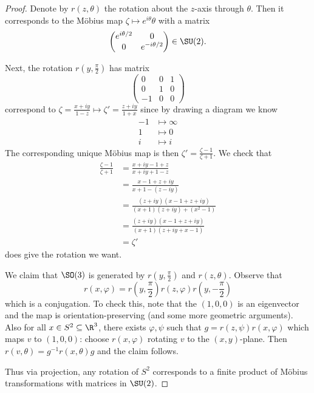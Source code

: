 \documentclass[a4paper]{article}
\theoremstyle{definition}
\begin{document}
\begin{proof}
  Denote by \(r(z, \theta)\) the rotation about the \(z\)-axis through \(\theta\). Then it corresponds to the Möbius map \(\zeta \mapsto e^{i\theta} \theta\) with a matrix
  \[
    \begin{pmatrix}
      e^{i\theta/2} & 0 \\
      0 & e^{-i\theta/2}
    \end{pmatrix}
    \in \SU(2).
  \]

  Next, the rotation \(r(y, \frac{\pi}{2})\) has matrix
  \[
    \begin{pmatrix}
      0 & 0 & 1 \\
      0 & 1 & 0 \\
      -1 & 0 & 0
    \end{pmatrix}
  \]
  correspond to \(\zeta = \frac{x + iy}{1 - z} \mapsto \zeta' = \frac{z + iy}{1 + x}\) since by drawing a diagram we know
  \begin{align*}
    -1 &\mapsto \infty \\
    1 &\mapsto 0 \\
    i &\mapsto i
  \end{align*}
  The corresponding unique Möbius map is then \(\zeta' = \frac{\zeta - 1}{\zeta + 1}\). We check that
  \begin{align*}
    \frac{\zeta - 1}{\zeta + 1}
    &= \frac{x + iy - 1 + z}{x + iy +1 - z} \\
    &= \frac{x - 1 + z + iy}{x + 1 - (z - iy)} \\
    &= \frac{(z + iy)(x - 1 + z + iy)}{(x + 1)(z + iy) + (x^2 - 1)} \\
    &= \frac{(z + iy)(x - 1 + z + iy)}{(x + 1)(z + iy + x -1)} \\
    &= \zeta'
  \end{align*}
  does give the rotation we want.

  We claim that \(\SO(3)\) is generated by \(r(y, \frac{\pi}{2})\) and \(r(z, \theta)\). Observe that
  \[
    r(x, \varphi) = r(y, \frac{\pi}{2}) r(z, \varphi) r(y, -\frac{\pi}{2})
  \]
  which is a conjugation. To check this, note that the \((1, 0, 0)\) is an eigenvector and the map is orientation-preserving (and some more geometric arguments). Also for all \(x \in S^2 \subseteq \R^3\), there exists \(\varphi, \psi\) such that \(g =r(z, \psi) r(x, \varphi)\) which maps \(v\) to \((1, 0, 0)\): choose \(r(x, \varphi)\) rotating \(v\) to the \((x, y)\)-plane. Then \(r(v, \theta) = g^{-1} r(x, \theta) g\) and the claim follows.

  Thus via projection, any rotation of \(S^2\) corresponds to a finite product of Möbius transformations with matrices in \(\SU(2)\).
\end{proof}
\end{document}
